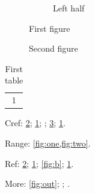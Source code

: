 \documentclass{article}
\begin{document}
\begin{figure}[h]
  \centering
  \begin{subfigure}{0.4\textwidth}
    \centering
    \caption{Left half}\label{fig:a}
  \end{subfigure}
  \caption{First figure}\label{fig:one}
\end{figure}
\begin{figure}[h]
  \centering
  \captionsetup{name=Fig.}
  \caption{Second figure}\label{fig:two}
\end{figure}
\begin{table}[h]
  \centering
  \caption{First table}\label{tab:one}
  \begin{tabular}{c}1\end{tabular}
\end{table}
\begin{center}
  \label{fig:out}
\end{center}

Cref: \cref{fig:one}; \cref{fig:a}; ; \cref{fig:two}; \cref{tab:one}.

Range: \cref{fig:one,fig:two}.

Ref: \ref{fig:one}; \ref{fig:a}; \ref{fig:b}; \ref{tab:one}.

More: \cref{fig:out}; ; .
\end{document}
